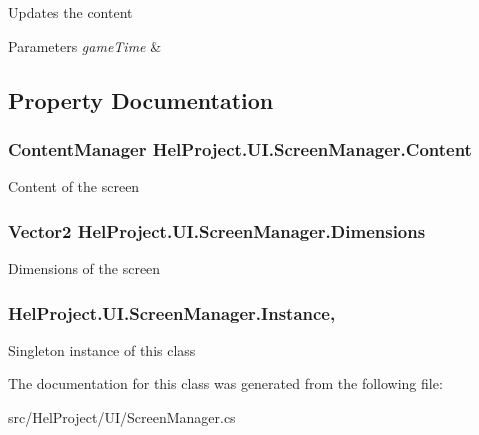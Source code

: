 Updates the content 


\begin{DoxyParams}{Parameters}
{\em game\+Time} & \\
\hline
\end{DoxyParams}


\subsection{Property Documentation}
\hypertarget{class_hel_project_1_1_u_i_1_1_screen_manager_a0e0ac0e0475a6a7fa4e21c2c413a7bcc}{}
\subsubsection[{Content}]{\setlength{\rightskip}{0pt plus 5cm}Content\+Manager Hel\+Project.\+U\+I.\+Screen\+Manager.\+Content\hspace{0.3cm}{\ttfamily [get]}}\label{class_hel_project_1_1_u_i_1_1_screen_manager_a0e0ac0e0475a6a7fa4e21c2c413a7bcc}


Content of the screen 

\hypertarget{class_hel_project_1_1_u_i_1_1_screen_manager_abb86f242ecaa5f540e91701af01696de}{}
\subsubsection[{Dimensions}]{\setlength{\rightskip}{0pt plus 5cm}Vector2 Hel\+Project.\+U\+I.\+Screen\+Manager.\+Dimensions\hspace{0.3cm}{\ttfamily [get]}}\label{class_hel_project_1_1_u_i_1_1_screen_manager_abb86f242ecaa5f540e91701af01696de}


Dimensions of the screen 

\hypertarget{class_hel_project_1_1_u_i_1_1_screen_manager_acf1138ad8b8146a517d7b5288e3792de}{}
\subsubsection[{Instance}]{ Hel\+Project.\+U\+I.\+Screen\+Manager.\+Instance\hspace{0.3cm}{\ttfamily [static]}, {\ttfamily [get]}}\label{class_hel_project_1_1_u_i_1_1_screen_manager_acf1138ad8b8146a517d7b5288e3792de}


Singleton instance of this class 



The documentation for this class was generated from the following file\+:\begin{DoxyCompactItemize}
\item 
src/\+Hel\+Project/\+U\+I/Screen\+Manager.\+cs\end{DoxyCompactItemize}
